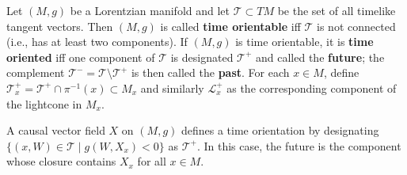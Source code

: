 Let $(M, g)$ be a Lorentzian manifold and let $\mathcal{T} \subset TM$ be the set of all timelike tangent vectors. Then $(M, g)$ is called \textbf{time orientable} iff $\mathcal{T}$ is not connected (i.e., has at least two components). If $(M, g)$ is time orientable, it is \textbf{time oriented} iff one component of $\mathcal{T}$ is designated $\mathcal{T}^+$ and called the \textbf{future}; the complement $\mathcal{T}^- = \mathcal{T} \setminus \mathcal{T}^+$ is then called the \textbf{past}. For each $x \in M$, define $\mathcal{T}_x^+ = \mathcal{T}^+ \cap \pi^{-1}(x) \subset M_x$ and similarly $\mathcal{L}_x^+$ as the corresponding component of the lightcone in $M_x$.

A causal vector field $X$ on $(M, g)$ defines a time orientation by designating $\{ (x, W) \in \mathcal{T} \mid g(W, X_x) < 0 \}$ as $\mathcal{T}^+$. In this case, the future is the component whose closure contains $X_x$ for all $x \in M$.
